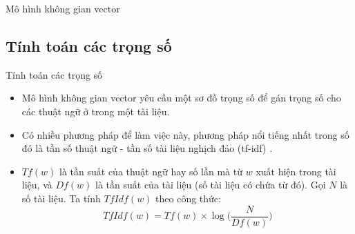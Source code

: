 \documentclass[10pt]{beamer}
\theoremstyle{remark}
\theoremstyle{definition}
\begin{document}
\begin{frame}{Mô hình không gian vector}
	\begin{table}[h!]
    \end{table}
\end{frame}

\subsection{Tính toán các trọng số}

\begin{frame}{Tính toán các trọng số}
	\begin{itemize}
		\item Mô hình không gian vector yêu cầu một sơ đồ trọng số để gán trọng số cho các thuật ngữ ở trong một tài liệu.
		\item Có nhiều phương pháp để làm việc này, phương pháp nổi tiếng nhất trong số đó là tần số thuật ngữ - tần số tài liệu nghịch đảo (tf-idf) \cite{355}.
		\item  $Tf(w)$ là tần suất của thuật ngữ hay số lần mà từ $w$ xuất hiện trong tài liệu, và $Df(w)$ là tần suất của tài liệu (số tài liệu có chứa từ đó).
		Gọi $N$ là số tài liệu. Ta tính $TfIdf(w)$ theo công thức:
		\begin{equation}
			TfIdf(w) = Tf(w) \times \log \Big( \dfrac{N}{Df(w)} \Big)
		\end{equation}
	\end{itemize}
\end{frame}
\end{document}
